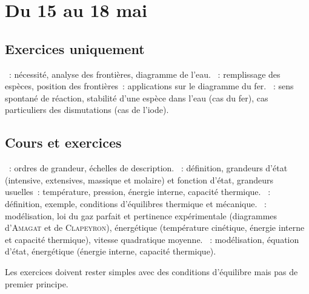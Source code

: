 \documentclass[a4paper, 10pt, final, garamond]{book}
\begin{document}
\setcounter{chapter}{24}

\chapter{Du 15 au 18 mai}

\section{Exercices uniquement}
\begin{enumerate}[label=\Roman*]
	~: nécessité, analyse des frontières, diagramme de l'eau.
	~: remplissage des espèces, position des
	frontières~: applications sur le diagramme du fer.
	~: sens spontané de réaction, stabilité d'une espèce dans
	l'eau (cas du fer), cas particuliers des dismutations (cas de l'iode).
\end{enumerate}

\section{Cours et exercices}
\begin{enumerate}[label=\Roman*]
	~: ordres de grandeur, échelles de description.
	~: définition, grandeurs d'état (intensive, extensives,
	massique et molaire) et fonction d'état, grandeurs usuelles~: température,
	pression, énergie interne, capacité thermique.
	~: définition, exemple, conditions
	d'équilibres thermique et mécanique.
	~: modélisation, loi du gaz parfait et pertinence
	expérimentale (diagrammes d'\textsc{Amagat} et de \textsc{Clapeyron}),
	énergétique (température cinétique, énergie interne
	et capacité thermique), vitesse quadratique moyenne.
	~: modélisation, équation d'état, énergétique
	(énergie interne, capacité thermique).
\end{enumerate}

\begin{framed}
	\begin{center}
		\large
		Les exercices doivent rester simples avec des conditions d'équilibre mais
		pas de premier principe.
	\end{center}
\end{framed}
\end{document}
